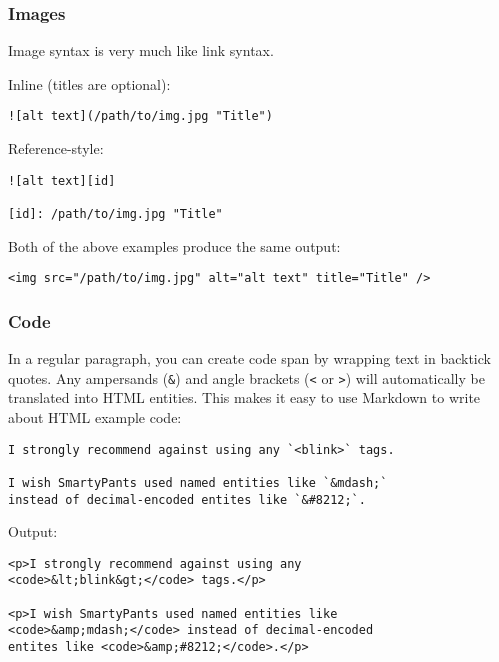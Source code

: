 \subsubsection*{Images}




Image syntax is very much like link syntax.



Inline (titles are optional):

\begin{lstlisting}
![alt text](/path/to/img.jpg "Title")
\end{lstlisting}




Reference-style:

\begin{lstlisting}
![alt text][id]

[id]: /path/to/img.jpg "Title"
\end{lstlisting}




Both of the above examples produce the same output:

\begin{lstlisting}
<img src="/path/to/img.jpg" alt="alt text" title="Title" />
\end{lstlisting}


\subsubsection*{Code}




In a regular paragraph, you can create code span by wrapping text in
backtick quotes. Any ampersands (\texttt{\&}) and angle brackets (\texttt{<} or
\texttt{>}) will automatically be translated into HTML entities. This makes
it easy to use Markdown to write about HTML example code:

\begin{lstlisting}
I strongly recommend against using any `<blink>` tags.

I wish SmartyPants used named entities like `&mdash;`
instead of decimal-encoded entites like `&#8212;`.
\end{lstlisting}




Output:

\begin{lstlisting}
<p>I strongly recommend against using any
<code>&lt;blink&gt;</code> tags.</p>

<p>I wish SmartyPants used named entities like
<code>&amp;mdash;</code> instead of decimal-encoded
entites like <code>&amp;#8212;</code>.</p>
\end{lstlisting}




